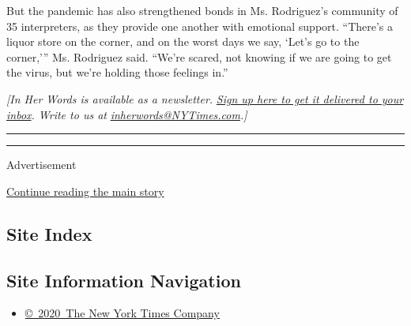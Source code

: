 But the pandemic has also strengthened bonds in Ms. Rodriguez's
community of 35 interpreters, as they provide one another with emotional
support. ``There's a liquor store on the corner, and on the worst days
we say, `Let's go to the corner,''' Ms. Rodriguez said. ``We're scared,
not knowing if we are going to get the virus, but we're holding those
feelings in.''

\emph{{[}In Her Words is available as a newsletter.}
\href{https://www.nytimes3xbfgragh.onion/newsletters/in-her-words}{\emph{Sign
up here to get it delivered to your inbox}}\emph{. Write to us at}
\href{mailto:inherwords@NYTimes.com}{\emph{inherwords@NYTimes.com}}\emph{.{]}}

\begin{center}\rule{0.5\linewidth}{\linethickness}\end{center}

\begin{center}\rule{0.5\linewidth}{\linethickness}\end{center}

Advertisement

\protect\hyperlink{after-bottom}{Continue reading the main story}

\hypertarget{site-index}{%
\subsection{Site Index}\label{site-index}}

\hypertarget{site-information-navigation}{%
\subsection{Site Information
Navigation}\label{site-information-navigation}}

\begin{itemize}
\tightlist
\item
  \href{https://help.nytimes3xbfgragh.onion/hc/en-us/articles/115014792127-Copyright-notice}{©~2020~The
  New York Times Company}
\end{itemize}

